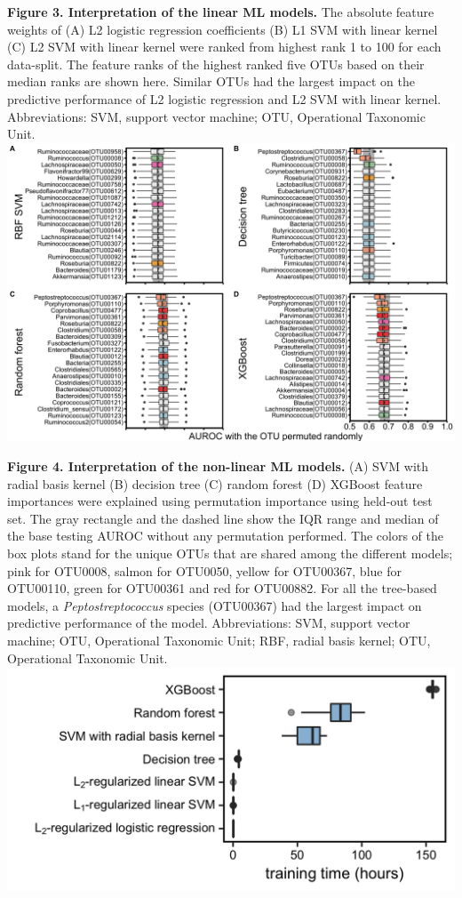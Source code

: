 \documentclass[11pt,]{article}
\begin{document}
\textbf{Figure 3. Interpretation of the linear ML models.} The absolute
feature weights of (A) L2 logistic regression coefficients (B) L1 SVM
with linear kernel (C) L2 SVM with linear kernel were ranked from
highest rank 1 to 100 for each data-split. The feature ranks of the
highest ranked five OTUs based on their median ranks are shown here.
Similar OTUs had the largest impact on the predictive performance of L2
logistic regression and L2 SVM with linear kernel. Abbreviations: SVM,
support vector machine; OTU, Operational Taxonomic Unit. \newpage
\includegraphics{Figure_4.png}

\textbf{Figure 4. Interpretation of the non-linear ML models.} (A) SVM
with radial basis kernel (B) decision tree (C) random forest (D) XGBoost
feature importances were explained using permutation importance using
held-out test set. The gray rectangle and the dashed line show the IQR
range and median of the base testing AUROC without any permutation
performed. The colors of the box plots stand for the unique OTUs that
are shared among the different models; pink for OTU0008, salmon for
OTU0050, yellow for OTU00367, blue for OTU00110, green for OTU00361 and
red for OTU00882. For all the tree-based models, a
\emph{Peptostreptococcus} species (OTU00367) had the largest impact on
predictive performance of the model. Abbreviations: SVM, support vector
machine; OTU, Operational Taxonomic Unit; RBF, radial basis kernel; OTU,
Operational Taxonomic Unit. \newpage
\includegraphics{Figure_5.png}
\end{document}
